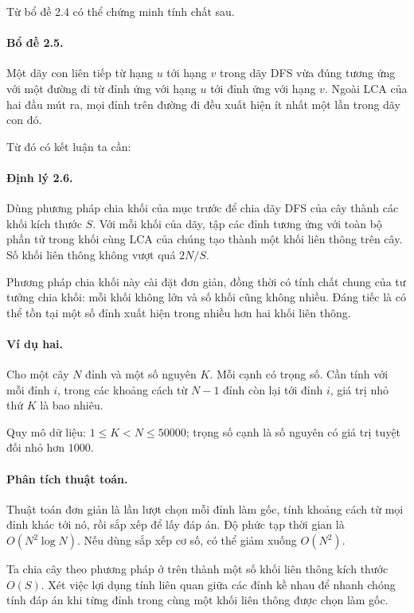 \documentclass[11pt]{article}
\begin{document}
Từ bổ đề 2.4 có thể chứng minh tính chất sau.

\paragraph{Bổ đề 2.5.}
Một dãy con liên tiếp từ hạng \(u\) tới hạng \(v\) trong dãy DFS vừa đúng
tương ứng với một đường đi từ đỉnh ứng với hạng \(u\) tới đỉnh ứng với hạng
\(v\). Ngoài LCA của hai đầu mút ra, mọi đỉnh trên đường đi đều xuất hiện ít
nhất một lần trong dãy con đó.

Từ đó có kết luận ta cần:

\paragraph{Định lý 2.6.}
Dùng phương pháp chia khối của mục trước để chia dãy DFS của cây thành các
khối kích thước \(S\). Với mỗi khối của dãy, tập các đỉnh tương ứng với toàn
bộ phần tử trong khối cùng LCA của chúng tạo thành một khối liên thông trên
cây. Số khối liên thông không vượt quá \(2N/S\).

Phương pháp chia khối này cài đặt đơn giản, đồng thời có tính chất chung của
tư tưởng chia khối: mỗi khối không lớn và số khối cũng không nhiều. Đáng tiếc
là có thể tồn tại một số đỉnh xuất hiện trong nhiều hơn hai khối liên thông.

\paragraph{Ví dụ hai.}
Cho một cây \(N\) đỉnh và một số nguyên \(K\). Mỗi cạnh có trọng số. Cần tính
với mỗi đỉnh \(i\), trong các khoảng cách từ \(N-1\) đỉnh còn lại tới đỉnh
\(i\), giá trị nhỏ thứ \(K\) là bao nhiêu.

Quy mô dữ liệu: \(1\le K<N\le 50000\); trọng số cạnh là số nguyên có giá trị
tuyệt đối nhỏ hơn \(1000\).

\paragraph{Phân tích thuật toán.}
Thuật toán đơn giản là lần lượt chọn mỗi đỉnh làm gốc, tính khoảng cách từ
mọi đỉnh khác tới nó, rồi sắp xếp để lấy đáp án. Độ phức tạp thời gian là
\(O(N^2\log N)\). Nếu dùng sắp xếp cơ số, có thể giảm xuống \(O(N^2)\).

Ta chia cây theo phương pháp ở trên thành một số khối liên thông kích thước
\(O(S)\). Xét việc lợi dụng tính liên quan giữa các đỉnh kề nhau để nhanh
chóng tính đáp án khi từng đỉnh trong cùng một khối liên thông được chọn làm
gốc.
\end{document}
